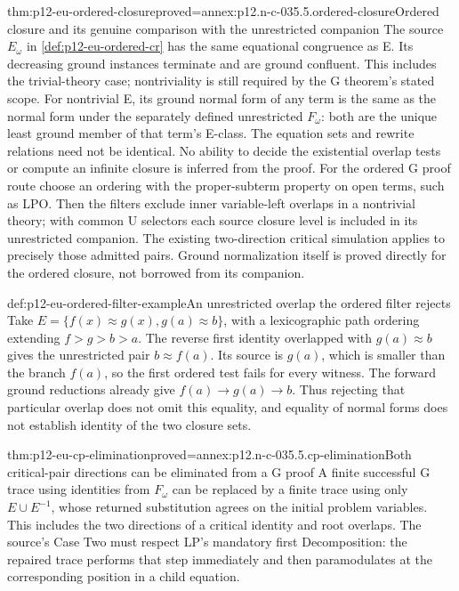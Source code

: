 \begin{hbtheorem}{thm:p12-eu-ordered-closure}{proved=annex:p12.n-c-035.5.ordered-closure}{Ordered closure and its genuine comparison with the unrestricted companion}
The source \(E_\omega\) in \cref{def:p12-eu-ordered-cr} has the
same equational congruence as E. Its decreasing ground instances
terminate and are ground confluent. This includes the trivial-theory
case; nontriviality is still required by the G theorem's stated scope.
For nontrivial E, its ground normal form of any term is the same as
the normal form under the separately defined unrestricted \(F_\omega\):
both are the unique least ground member of that term's E-class.
The equation sets and rewrite relations need not be identical.
No ability to decide the existential overlap tests or compute an
infinite closure is inferred from the proof.
For the ordered G proof route choose an ordering with the proper-subterm
property on open terms, such as LPO. Then the filters exclude inner
variable-left overlaps in a nontrivial theory; with common U selectors
each source closure level is included in its unrestricted companion.
The existing two-direction critical simulation applies to precisely
those admitted pairs. Ground normalization itself is proved directly
for the ordered closure, not borrowed from its companion.
\cite[Lemma 4.11, pp.~492--493]{BaaderSnyder2001}
\cite[Definition 6.2 and Theorem 6.3, p.~569]{DershowitzPlaisted2001Rewriting}
\end{hbtheorem}

\begin{hbexample}{def:p12-eu-ordered-filter-example}{An unrestricted overlap the ordered filter rejects}
Take \(E=\{f(x)\approx g(x),g(a)\approx b\}\), with a
lexicographic path ordering extending \(f>g>b>a\). The reverse
first identity overlapped with \(g(a)\approx b\) gives the
unrestricted pair \(b\approx f(a)\). Its source is \(g(a)\),
which is smaller than the branch \(f(a)\), so the first ordered
test fails for every witness. The forward ground reductions already
give \(f(a)\to g(a)\to b\). Thus rejecting that particular
overlap does not omit this equality, and equality of normal forms
does not establish identity of the two closure sets.
\end{hbexample}

\begin{hbtheorem}{thm:p12-eu-cp-elimination}{proved=annex:p12.n-c-035.5.cp-elimination}{Both critical-pair directions can be eliminated from a G proof}
A finite successful G trace using identities from \(F_\omega\)
can be replaced by a finite trace using only \(E\cup E^{-1}\),
whose returned substitution agrees on the initial problem variables.
This includes the two directions of a critical identity and root
overlaps. The source's Case Two must respect LP's mandatory first
Decomposition: the repaired trace performs that step immediately and
then paramodulates at the corresponding position in a child equation.
\cite[Lemma 4.12, pp.~493--494]{BaaderSnyder2001}
\end{hbtheorem}

